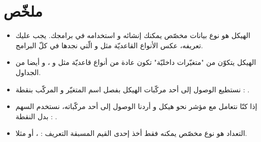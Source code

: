 \section*{ملخّص}
\begin{itemize}
  \item الهيكل هو نوع بيانات مخصّص يمكنك إنشائه و استخدامه في برامجك. يجب عليك تعريفه، عكس الأنواع القاعديّة مثل
و
الّتي نجدها في كلّ البرامج.
  \item الهيكل يتكوّن من "متغيّرات داخليّة" تكون عادة من أنواع قاعديّة مثل
و
،
و أيضا من الجداول.
  \item نستطيع الوصول إلى أحد مركّبات الهيكل بفصل اسم المتغيّر و المركّب بنقطة :
.
  \item إذا كنّا نتعامل مع مؤشر نحو هيكل و أردنا الوصول إلى أحد مركّباته، نستخدم السهم بدل النقطة :
.
  \item التعداد هو نوع مخصّص يمكنه فقط أخذ إحدى القيم المسبقة التعريف :
،
أو
مثلا.
\end{itemize}
